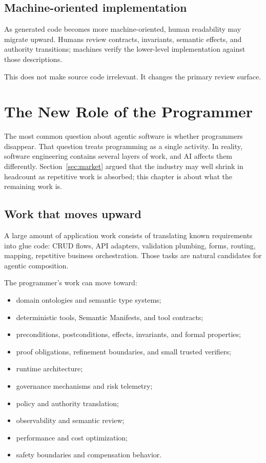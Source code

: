 \documentclass[10pt,oneside,openany]{book}
\begin{document}
\section{Machine-oriented implementation}
As generated code becomes more machine-oriented, human readability may migrate upward. Humans review contracts, invariants, semantic effects, and authority transitions; machines verify the lower-level implementation against those descriptions.

This does not make source code irrelevant. It changes the primary review surface.

\chapter{The New Role of the Programmer}

The most common question about agentic software is whether programmers disappear. That question treats programming as a single activity. In reality, software engineering contains several layers of work, and AI affects them differently. Section~\ref{sec:market} argued that the industry may well shrink in headcount as repetitive work is absorbed; this chapter is about what the remaining work is.

\section{Work that moves upward}
A large amount of application work consists of translating known requirements into glue code: CRUD flows, API adapters, validation plumbing, forms, routing, mapping, repetitive business orchestration. Those tasks are natural candidates for agentic composition.

The programmer's work can move toward:

\begin{itemize}
\item domain ontologies and semantic type systems;
\item deterministic tools, Semantic Manifests, and tool contracts;
\item preconditions, postconditions, effects, invariants, and formal properties;
\item proof obligations, refinement boundaries, and small trusted verifiers;
\item runtime architecture;
\item governance mechanisms and risk telemetry;
\item policy and authority translation;
\item observability and semantic review;
\item performance and cost optimization;
\item safety boundaries and compensation behavior.
\end{itemize}
\end{document}
